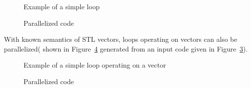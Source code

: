 \lstset{language=C,basicstyle=\scriptsize,numbers=left}
\begin{figure}[htbp]
{\indent
  {\mySmallFontSize
    \begin{latexonly}
    
    \end{latexonly}
    \begin{htmlonly}
    
    \end{htmlonly}
  }
}
\caption{Example of a simple loop}
\label{Manual:autopar:reduction}
\end{figure}

\begin{figure}[htbp]
{\indent
  {\mySmallFontSize
    \begin{latexonly}
    
    \end{latexonly}
    \begin{htmlonly}
    
    \end{htmlonly}
  }
}
\caption{Parallelized code}
\label{Manual:autopar:reduction-trans}
\end{figure}

With known semantics of STL vectors, loops operating on vectors can also be parallelized( shown in Figure~\ref{Manual:autopar:doall_vector2-trans} generated from  an input code given in Figure~\ref{Manual:autopar:doall_vector2}).

\lstset{language=C,basicstyle=\scriptsize,numbers=left}
\begin{figure}[htbp]
{\indent
  {\mySmallFontSize
    \begin{latexonly}
    
    \end{latexonly}
    \begin{htmlonly}
    
    \end{htmlonly}
  }
}
\caption{Example of a simple loop operating on a vector}
\label{Manual:autopar:doall_vector2}
\end{figure}

\begin{figure}[htbp]
{\indent
  {\mySmallFontSize
    \begin{latexonly}
    
    \end{latexonly}
    \begin{htmlonly}
    
    \end{htmlonly}
  }
}
\caption{Parallelized code}
\label{Manual:autopar:doall_vector2-trans}
\end{figure}

